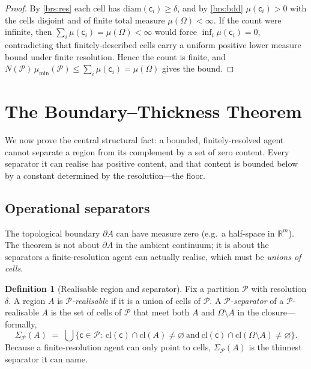 \documentclass[11pt,a4paper]{article}
\theoremstyle{thmstyle}
\theoremstyle{definition}
\newtheorem{definition}[theorem]{Definition}
\theoremstyle{remark}
\newcommand{\R}{\mathbb{R}}
\newcommand{\Space}{\Omega}
\newcommand{\Bdy}{\partial}
\newcommand{\cl}{\mathrm{cl}}
\newcommand{\diam}{\mathrm{diam}}
\newcommand{\reso}{\delta}
\newcommand{\Part}{\mathscr{P}}
\newcommand{\cell}{\mathsf{c}}
\begin{document}
\begin{proof}
By \ref{brs:res} each cell has $\diam(\cell_i)\ge\reso$, and by
\ref{brs:bdd} $\mu(\cell_i)>0$ with the cells disjoint and of finite total
measure $\mu(\Space)<\infty$. If the count were infinite, then
$\sum_i\mu(\cell_i)=\mu(\Space)<\infty$ would force
$\inf_i\mu(\cell_i)=0$, contradicting that finitely-described cells carry a
uniform positive lower measure bound under finite resolution. Hence the count
is finite, and $N(\Part)\,\mu_{\min}(\Part)\le\sum_i\mu(\cell_i)=\mu(\Space)$
gives the bound.
\end{proof}


\section{The Boundary--Thickness Theorem}
\label{sec:thickness}

We now prove the central structural fact: a bounded, finitely-resolved agent
cannot separate a region from its complement by a set of zero content. Every
separator it can realise has positive content, and that content is bounded
below by a constant determined by the resolution---the floor.

\subsection{Operational separators}

The topological boundary $\Bdy A$ can have measure zero (e.g.\ a half-space in
$\R^m$). The theorem is not about $\Bdy A$ in the ambient continuum; it is about
the separators a finite-resolution agent can actually realise, which must be
\emph{unions of cells}.

\begin{definition}[Realisable region and separator]
\label{def:realisable}
Fix a partition $\Part$ with resolution $\reso$. A region $A$ is
\emph{$\Part$-realisable} if it is a union of cells of $\Part$. A
\emph{$\Part$-separator} of a $\Part$-realisable $A$ is the set of cells of
$\Part$ that meet both $A$ and $\Space\setminus A$ in the closure---formally,
\[
\Sigma_\Part(A)\;=\;\bigcup\bigl\{\cell\in\Part:\ \cl(\cell)\cap\cl(A)\neq\varnothing
\ \text{and}\ \cl(\cell)\cap\cl(\Space\setminus A)\neq\varnothing\bigr\}.
\]
Because a finite-resolution agent can only point to cells, $\Sigma_\Part(A)$ is
the thinnest separator it can name.
\end{definition}
\end{document}
